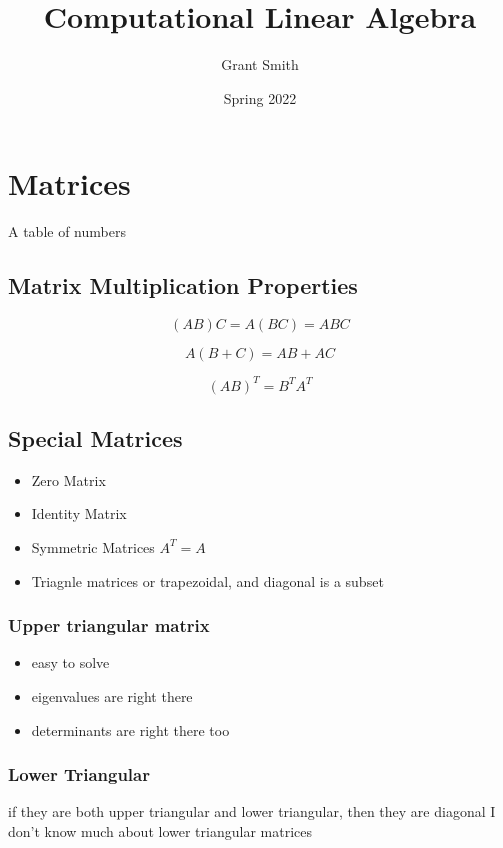 \documentclass{article}
\title{Computational Linear Algebra}
\author{Grant Smith}
\date{Spring 2022}
\begin{document}
\maketitle

\section{Matrices}

A table of numbers

\subsection{Matrix Multiplication Properties}

$$ (AB)C = A(BC) = ABC $$

$$ A(B+C) = AB + AC $$

$$ (AB)^{T} = B^{T}A^{T} $$

\subsection{Special Matrices}

\begin{itemize}
    \item Zero Matrix
    \item Identity Matrix
    \item Symmetric Matrices
    $A^T=A$
    
    \item Triagnle matrices or trapezoidal, and diagonal is a subset
    
    
\end{itemize}
\subsubsection{Upper triangular matrix}
\begin{itemize}
 \item easy to solve
\item eigenvalues are right there
\item determinants are right there too   
\end{itemize}

\subsubsection{Lower Triangular}
if they are both upper triangular and lower triangular, then they are diagonal
I don't know much about lower triangular matrices
\end{document}

